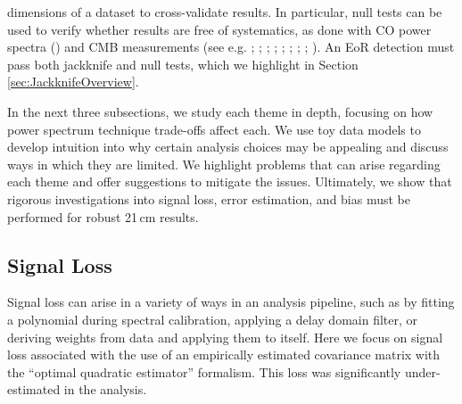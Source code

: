 \documentclass[preprint2,numberedappendix,tighten]{aastex6}  %
\begin{document}
\begin{itemize}
dimensions of a dataset to cross-validate results. In particular, null tests can be used to verify whether results are free of 
systematics, as done with CO power spectra (\citealt{keating_et_al2016}) and CMB measurements (see e.g. \citealt{ade_et_al2008}; \citealt{chiang_et_al2010}; \citealt{bischoff_et_al2011}; \citealt{das_et_al2011b}; \citealt{araujo_et_al2012}; \citealt{crites_et_al2015}; \citealt{ade_et_al2016}; \citealt{ade_et_al2017}; \citealt{sherwin_et_al2017}). An EoR detection must pass both jackknife and null tests, which we highlight in Section \ref{sec:JackknifeOverview}.
\end{itemize}

In the next three subsections, we study each theme in depth, focusing on how power spectrum technique trade-offs affect each. 
We use toy data models to develop intuition into why certain analysis choices may be appealing and discuss ways in which 
they are limited. We highlight problems that can arise regarding each theme and offer suggestions to mitigate the issues. 
Ultimately, we show that rigorous investigations into signal loss, error estimation, and bias must be performed for robust 21\,cm results.


\subsection{Signal Loss}
\label{sec:SiglossOverview}

Signal loss can arise in a variety of ways in an analysis pipeline, such as by fitting a polynomial during spectral calibration, applying a delay domain filter, or deriving weights from data and applying them to itself. Here we focus on signal loss associated with 
the use of an empirically estimated covariance matrix with the ``optimal quadratic estimator'' formalism.
This loss was significantly 
under-estimated in the  analysis.

\end{document}
